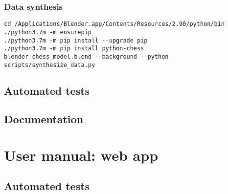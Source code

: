 \documentclass[../../report.tex]{subfiles}
\begin{document}
\subsection{Data synthesis}
\label{sec:user_man_chesscog_data_synthesis}
\begin{verbatim}
cd /Applications/Blender.app/Contents/Resources/2.90/python/bin
./python3.7m -m ensurepip
./python3.7m -m pip install --upgrade pip
./python3.7m -m pip install python-chess
blender chess_model.blend --background --python scripts/synthesize_data.py
\end{verbatim}

\section{Automated tests}
\label{sec:chesscog_tests}

\section{Documentation}
\label{sec:chesscog_documentation}

\chapter{User manual: web app}
\label{chap:user_man_chesscogapp}

\section{Automated tests}
\label{sec:chesscogapp_tests}
\end{document}
